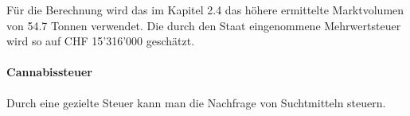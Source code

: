\documentclass[../main.tex]{subfiles}
\begin{document}
	 
	 \noindent
	 Für die Berechnung wird das im Kapitel 2.4 das höhere ermittelte Marktvolumen von 54.7 Tonnen verwendet.	 
	 Die durch den Staat eingenommene Mehrwertsteuer wird so auf CHF 15'316'000 geschätzt.
	 
	 
	 
	 \paragraph{Cannabissteuer}
	 Durch eine gezielte Steuer kann man die Nachfrage von Suchtmitteln steuern. 
	 
	 
	 
	 
	 
	 
	 
\end{document}
